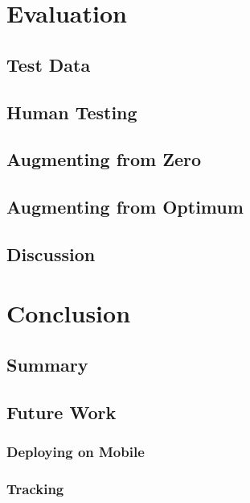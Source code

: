 \documentclass[10pt]{book}
\begin{document}
\chapter{Evaluation}
\label{chap:eval}

\section{Test Data}

\section{Human Testing}

\section{Augmenting from Zero}

\section{Augmenting from Optimum}

\section{Discussion}


\chapter{Conclusion}
\label{chap:conclusion}

\section{Summary}

\section{Future Work}

\subsection{Deploying on Mobile}

\subsection{Tracking}
\end{document}
